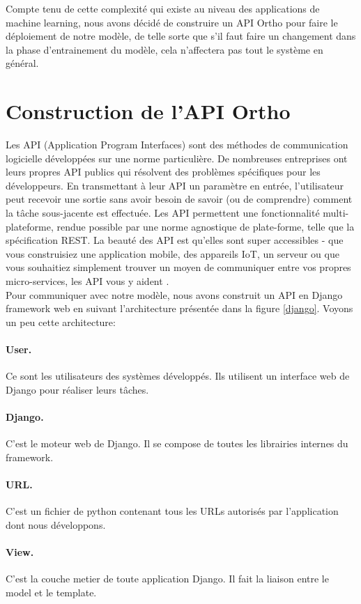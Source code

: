 \documentclass[12pt, french]{report}
\begin{document}
Compte tenu de cette complexité qui existe au niveau des applications de machine learning, nous avons décidé de construire un API Ortho pour faire le déploiement de notre modèle, de telle sorte que s'il faut faire un changement dans la phase d'entrainement du modèle, cela n'affectera pas tout le système en général.  

\section{Construction de l'API Ortho}

Les API (Application Program Interfaces) sont des méthodes de communication logicielle développées sur une norme particulière. De nombreuses entreprises ont leurs propres API publics qui résolvent des problèmes spécifiques pour les développeurs. En transmettant à leur API un paramètre en entrée, l'utilisateur peut recevoir une sortie sans avoir besoin de savoir (ou de comprendre) comment la tâche sous-jacente est effectuée. Les API permettent une fonctionnalité multi-plateforme, rendue possible par une norme agnostique de plate-forme, telle que la spécification REST. La beauté des API est qu'elles sont super accessibles - que vous construisiez une application mobile, des appareils IoT, un serveur ou que vous souhaitiez simplement trouver un moyen de communiquer entre vos propres micro-services, les API vous y aident \cite{key8}.\\

Pour communiquer avec notre modèle, nous avons construit un API en Django framework web en suivant l'architecture présentée dans la figure \ref{django}. Voyons un peu cette architecture:
\paragraph{User.} Ce sont les utilisateurs des systèmes développés. Ils utilisent un interface web de Django pour réaliser leurs tâches.
\paragraph{Django.} C'est le moteur web de Django. Il se compose de toutes les librairies internes du framework.
\paragraph{URL. } C'est un fichier de python contenant tous les URLs autorisés par l'application dont nous développons.
\paragraph{View. } C'est la couche metier de toute application Django. Il fait la liaison entre le model et le template. 
\end{document}
